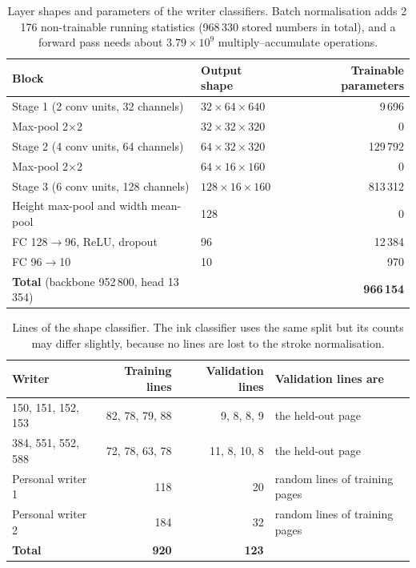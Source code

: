 \begin{table}[h]
\centering
\fontsize{9.5}{11.5}\selectfont
\begin{tabular}{|l|l|r|}
\hline
\textbf{Block} & \textbf{Output shape} & \textbf{Trainable parameters} \\
\hline
Stage 1 (2 conv units, 32 channels) & $32\times64\times640$ & 9\,696 \\
Max-pool 2$\times$2 & $32\times32\times320$ & 0 \\
Stage 2 (4 conv units, 64 channels) & $64\times32\times320$ & 129\,792 \\
Max-pool 2$\times$2 & $64\times16\times160$ & 0 \\
Stage 3 (6 conv units, 128 channels) & $128\times16\times160$ & 813\,312 \\
Height max-pool and width mean-pool & 128 & 0 \\
FC 128$\to$96, ReLU, dropout & 96 & 12\,384 \\
FC 96$\to$10 & 10 & 970 \\
\hline
\textbf{Total} (backbone 952\,800, head 13\,354) & & \textbf{966\,154} \\
\hline
\end{tabular}
\caption{Layer shapes and parameters of the writer classifiers. Batch normalisation adds 2\,176 non-trainable running statistics (968\,330 stored numbers in total), and a forward pass needs about $3.79\times10^9$ multiply--accumulate operations.}
\label{tab:wid-layers}
\end{table}

\begin{table}[h]
\centering
\fontsize{9.5}{11.5}\selectfont
\begin{tabular}{|l|r|r|l|}
\hline
\textbf{Writer} & \textbf{Training lines} & \textbf{Validation lines} & \textbf{Validation lines are} \\
\hline
150, 151, 152, 153 & 82, 78, 79, 88 & 9, 8, 8, 9 & the held-out page \\
384, 551, 552, 588 & 72, 78, 63, 78 & 11, 8, 10, 8 & the held-out page \\
Personal writer 1 & 118 & 20 & random lines of training pages \\
Personal writer 2 & 184 & 32 & random lines of training pages \\
\hline
\textbf{Total} & \textbf{920} & \textbf{123} & \\
\hline
\end{tabular}
\caption{Lines of the shape classifier. The ink classifier uses the same split but its counts may differ slightly, because no lines are lost to the stroke normalisation.}
\label{tab:wid-data}
\end{table}

